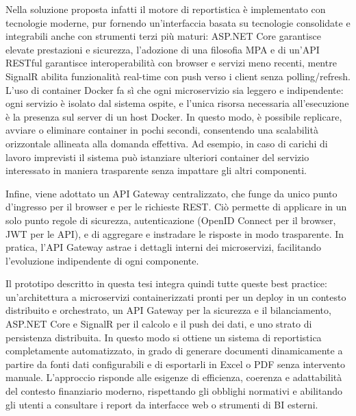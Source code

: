 Nella soluzione proposta infatti il motore di reportistica è implementato con tecnologie moderne, pur fornendo un'interfaccia basata su tecnologie consolidate e integrabili anche con strumenti terzi più maturi: ASP.NET Core garantisce elevate prestazioni e sicurezza, l'adozione di una filosofia MPA e di un'API RESTful garantisce interoperabilità con browser e servizi meno recenti, mentre SignalR abilita funzionalità real-time con push verso i client senza polling/refresh.
L’uso di container Docker fa sì che ogni microservizio sia leggero e indipendente: ogni servizio è isolato dal sistema ospite, e l'unica risorsa necessaria all'esecuzione è la presenza sul server di un host Docker. In questo modo, è possibile replicare, avviare o eliminare container in pochi secondi, consentendo una scalabilità orizzontale allineata alla domanda effettiva. Ad esempio, in caso di carichi di lavoro imprevisti il sistema può istanziare ulteriori container del servizio interessato in maniera trasparente senza impattare gli altri componenti.

Infine, viene adottato un API Gateway centralizzato, che funge da unico punto d'ingresso per il browser e per le richieste REST. Ciò permette di applicare in un solo punto regole di sicurezza, autenticazione (OpenID Connect per il browser, JWT per le API), e di aggregare e instradare le risposte in modo trasparente. In pratica, l’API Gateway astrae i dettagli interni dei microservizi, facilitando l’evoluzione indipendente di ogni componente.

Il prototipo descritto in questa tesi integra quindi tutte queste best practice: un’architettura a microservizi containerizzati pronti per un deploy in un contesto distribuito e orchestrato, un API Gateway per la sicurezza e il bilanciamento, ASP.NET Core e SignalR per il calcolo e il push dei dati, e uno strato di persistenza distribuita. In questo modo si ottiene un sistema di reportistica completamente automatizzato, in grado di generare documenti dinamicamente a partire da fonti dati configurabili e di esportarli in Excel o PDF senza intervento manuale. L’approccio risponde alle esigenze di efficienza, coerenza e adattabilità del contesto finanziario moderno, rispettando gli obblighi normativi e abilitando gli utenti a consultare i report da interfacce web o strumenti di BI esterni.






